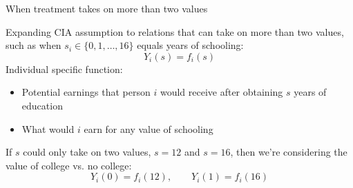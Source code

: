 \documentclass[compress, 8pt]{beamer}
\begin{document}
\begin{frame}{When treatment takes on more than two values}

Expanding CIA assumption to relations that can take on more than two values, such as when $s_i \in \{0, 1, \dots, 16\}$ equals years of schooling:
\begin{equation*}
    Y_{i} (s) = f_i (s)
\end{equation*}
Individual specific function:
\begin{itemize}
    \item Potential earnings that person $i$ would receive after obtaining $s$ years of education
    \item What would $i$ earn for any value of schooling
\end{itemize}

\vspace{2ex}
If $s$ could only take on two values, $s=12$ and $s=16$, then we're considering the value of college vs. no college:
\begin{equation*}
    Y_i(0) = f_i(12), \quad \quad Y_i(1) = f_i(16)
\end{equation*}

\end{frame}
\end{document}
